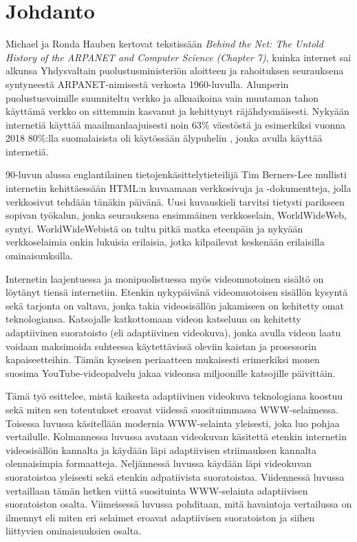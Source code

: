 \documentclass[finnish, 12pt, a4paper, elec, utf8, a-1b, online]{aaltothesis}
\begin{document}
\cleardoublepage


\section{Johdanto}
  Michael ja Ronda Hauben kertovat tekstissään \textit{Behind the Net: The Untold History of the ARPANET and
  Computer Science (Chapter 7)}, kuinka internet sai alkunsa Yhdysvaltain puolustusministeriön aloitteen ja rahoituksen seurauksena syntyneestä ARPANET-nimisestä verkosta 1960-luvulla. \cite{Hauben} Alunperin puolustusvoimille suunniteltu verkko ja alkuaikoina vain muutaman tahon käyttämä verkko on sittemmin kasvanut ja kehittynyt räjähdysmäisesti. Nykyään internetiä käyttää maailmanlaajuisesti noin 63\% väestöstä \cite{ITU} ja esimerkiksi vuonna 2018 80\%:lla suomalaisista oli käytössään älypuhelin \cite{SVT}, jonka avulla käyttää internetiä.

  90-luvun alussa englantilainen tietojenkäsittelytieteilijä Tim Berners-Lee mullisti internetin kehittäessään HTML:n kuvaamaan verkkosivuja ja -dokumentteja, jolla verkkosivut tehdään tänäkin päivänä. Uusi kuvauskieli tarvitsi tietysti parikseen sopivan työkalun, jonka seurauksena ensimmäinen verkkoselain, WorldWideWeb, syntyi. WorldWideWebistä on tultu pitkä matka eteenpäin ja nykyään verkkoselaimia onkin lukuisia erilaisia, jotka kilpailevat keskenään erilaisilla ominaisuuksilla.

  Internetin laajentuessa ja monipuolistuessa myös videomuotoinen sisältö on löytänyt tiensä internetiin. Etenkin nykypäivänä videomuotoisen sisällön kysyntä sekä tarjonta on valtava, jonka takia videosisällön jakamiseen on kehitetty omat teknologiansa. Katsojalle katkottomaan videon katseluun on kehitetty adaptiivinen suoratoisto (eli adaptiivinen videokuva), jonka avulla videon laatu voidaan maksimoida suhteessa käytettävissä oleviin kaistan ja prosessorin kapaiseetteihin. Tämän kyseisen periaatteen mukaisesti erimerkiksi monen suosima YouTube-videopalvelu jakaa videonsa miljoonille katsojille päivittäin.

  Tämä työ esittelee, mistä kaikesta adaptiivinen videokuva teknologiana koostuu sekä miten sen toteutukset eroavat viidessä suosituimmassa WWW-selaimessa. Toisessa luvussa käsitellään modernia WWW-selainta yleisesti, joka luo pohjaa vertailulle. Kolmannessa luvussa avataan videokuvan käsitettä etenkin internetin videosisällön kannalta ja käydään läpi adaptiivisen striimauksen kannalta olennaisimpia formaatteja. Neljännessä luvussa käydään läpi videokuvan suoratoistoa yleisesti sekä etenkin adpatiivista suoratoistoa. Viidennessä luvussa vertaillaan tämän hetken viittä suosituinta WWW-selainta adaptiivisen suoratoiston osalta. Viimeisessä luvussa pohditaan, mitä havaintoja vertailussa on ilmennyt eli miten eri selaimet eroavat adaptiivisen suoratoiston ja siihen liittyvien ominaisuuksien osalta.
\end{document}
